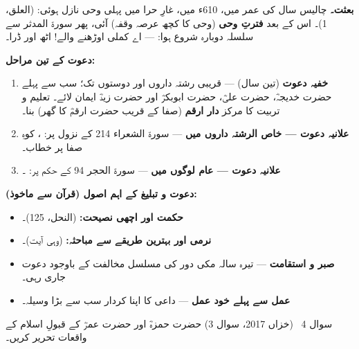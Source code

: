 \begin{hal}
\textbf{بعثت۔} چالیس سال کی عمر میں، \textenglish{610}ء میں، غارِ حرا میں
پہلی وحی نازل ہوئی:  (العلق،
\textenglish{1})۔ اس کے بعد \textbf{فترتِ وحی} (وحی کا کچھ عرصہ وقفہ) آئی،
پھر سورۃ المدثر سے سلسلہ دوبارہ شروع ہوا:  --- اے کملی اوڑھنے والے! اٹھ اور ڈرا۔

\medskip
\textbf{دعوت کے تین مراحل:}
\begin{enumerate}\setlength{\itemsep}{2pt}
  \item \textbf{خفیہ دعوت} (تین سال) --- قریبی رشتہ داروں اور دوستوں تک؛
        سب سے پہلے حضرت خدیجہؓ، حضرت علیؓ، حضرت ابوبکرؓ اور حضرت زیدؓ ایمان
        لائے۔ تعلیم و تربیت کا مرکز \textbf{دار ارقم} (صفا کے قریب حضرت
        ارقمؓ کا گھر) بنا۔
  \item \textbf{علانیہ دعوت --- خاص الرشتہ داروں میں} --- سورۃ الشعراء
        \textenglish{214} کے نزول پر: ، کوہِ صفا پر خطاب۔
  \item \textbf{علانیہ دعوت --- عام لوگوں میں} --- سورۃ الحجر
        \textenglish{94} کے حکم پر: ۔
\end{enumerate}

\medskip
\textbf{دعوت و تبلیغ کے اہم اصول (قرآن سے ماخوذ):}
\begin{itemize}\setlength{\itemsep}{1pt}
  \item \textbf{حکمت اور اچھی نصیحت:}  (النحل، \textenglish{125})۔
  \item \textbf{نرمی اور بہترین طریقے سے مباحثہ:}  (وہی آیت)۔
  \item \textbf{صبر و استقامت} --- تیرہ سالہ مکی دور کی مسلسل مخالفت کے
        باوجود دعوت جاری رہی۔
  \item \textbf{عمل سے پہلے خود عمل} --- داعی کا اپنا کردار سب سے بڑا وسیلہ۔
\end{itemize}
\end{hal}

\begin{sawal}{سوال \textenglish{4} \ \textnormal{\small(خزاں \textenglish{2017}، سوال \textenglish{3})}}
حضرت حمزہؓ اور حضرت عمرؓ کے قبولِ اسلام کے واقعات تحریر کریں۔
\end{sawal}

